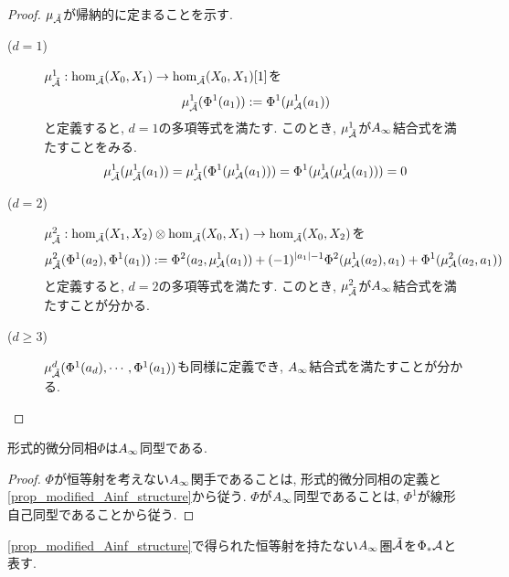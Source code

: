 \documentclass[uplatex, a4paper, 14Q, dvipdfmx]{jsarticle}
\begin{document}
\begin{proof}
  $\mu_{\tilde{\mathcal{A}}}$が帰納的に定まることを示す. 
  \begin{description}
    \item[($d=1$)] $\mu^1_{\tilde{\mathcal{A}}} : \hom_{\tilde{\mathcal{A}}}(X_0,X_1) \to \hom_{\tilde{\mathcal{A}}}(X_0,X_1)[1]$を
    \begin{align*}
      \mu^1_{\tilde{\mathcal{A}}} (\Phi^1(a_1))
      := \Phi^1(\mu^1_{\mathcal{A}}(a_1))
    \end{align*}
    と定義すると, $d=1$の多項等式を満たす.
    このとき, $\mu^1_{\tilde{\mathcal{A}}}$が$A_{\infty}$結合式を満たすことをみる. 
    \begin{align*}
      \mu^1_{\tilde{\mathcal{A}}} (\mu^1_{\tilde{\mathcal{A}}} (a_1))
      = \mu^1_{\tilde{\mathcal{A}}} (\Phi^1(\mu^1_{\mathcal{A}}(a_1))) 
      = \Phi^1(\mu^1_{\mathcal{A}} (\mu^1_{\mathcal{A}} (a_1))) 
      = 0
    \end{align*}
    \item[($d=2$)] $\mu^2_{\tilde{\mathcal{A}}} : \hom_{\tilde{\mathcal{A}}}(X_1,X_2) \otimes \hom_{\tilde{\mathcal{A}}}(X_0,X_1) \to \hom_{\tilde{\mathcal{A}}}(X_0,X_2)$を
    \begin{align*}
      \mu^2_{\tilde{\mathcal{A}}} (\Phi^1(a_2),\Phi^1(a_1)) 
      := \Phi^2(a_2,\mu^1_{\mathcal{A}}(a_1)) + (-1)^{|a_1|-1} \Phi^2(\mu^1_{\mathcal{A}}(a_2),a_1) + \Phi^1(\mu^2_{\mathcal{A}}(a_2,a_1))
    \end{align*}
    と定義すると, $d=2$の多項等式を満たす.
    このとき, $\mu^2_{\tilde{\mathcal{A}}}$が$A_{\infty}$結合式を満たすことが分かる. 
    \item[($d \geq 3$)] $\mu^d_{\tilde{\mathcal{A}}} (\Phi^1(a_d), \cdots, \Phi^1(a_1))$も同様に定義でき, $A_{\infty}$結合式を満たすことが分かる.
  \end{description}
\end{proof}

\begin{corollary} \label{prop_Phi_is_Ainf_functor}
  形式的微分同相$\Phi$は$A_{\infty}$同型である. 
\end{corollary}

\begin{proof}
  $\Phi$が恒等射を考えない$A_{\infty}$関手であることは, 形式的微分同相の定義と\cref{prop_modified_Ainf_structure}から従う. 
  $\Phi$が$A_{\infty}$同型であることは, $\Phi^1$が線形自己同型であることから従う.
\end{proof}


\begin{notation}
  \cref{prop_modified_Ainf_structure}で得られた恒等射を持たない$A_{\infty}$圏$\tilde{\mathcal{A}}$を$\Phi_\ast \mathcal{A}$と表す.
\end{notation}
\end{document}
